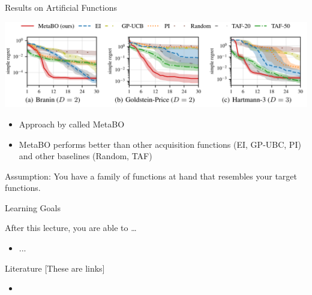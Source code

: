 \begin{frame}[c]{Results on Artificial Functions }

\centering
\includegraphics[width=1.0\textwidth]{images/l2acq_results.png}

\medskip

\begin{itemize}
	\item Approach by  called MetaBO
	\item MetaBO performs better than other acquisition functions (EI, GP-UBC, PI) and other baselines (Random, TAF)
\end{itemize}

\pause

\alert{Assumption}: You have a family of functions at hand that resembles your target functions.

\end{frame}

\begin{frame}[c]{Learning Goals}

After this lecture, you are able to \ldots

\begin{itemize}
	\item ...
\end{itemize}
\end{frame}

\begin{frame}[c]{Literature [These are links]}

\begin{itemize}
	\item \lit{\href{}{}}	
\end{itemize}

\end{frame}


